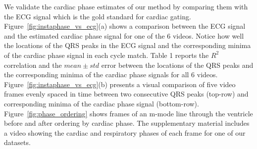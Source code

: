 \documentclass[runningheads,a4paper]{llncs}
\begin{document}
	We validate the cardiac phase estimates of our method by comparing them with the ECG signal which is the gold standard for cardiac gating. Figure~\ref{fig:instaphase_vs_ecg}(a) shows a comparison between the ECG signal and the estimated cardiac phase signal for one of the 6 videos. Notice how well the locations of the QRS peaks in the ECG signal and the corresponding minima of the cardiac phase signal in each cycle match. Table 1 reports the $R^2$ correlation and the $mean \pm std$ error between the locations of the QRS peaks and the corresponding minima of the cardiac phase signals for all 6 videos. Figure~\ref{fig:instaphase_vs_ecg}(b) presents a visual comparison of five video frames evenly spaced in time between two consecutive QRS peaks (top-row) and corresponding minima of the cardiac phase signal (bottom-row). Figure~\ref{fig:phase_ordering} shows frames of an m-mode line through the ventricle before and after ordering by cardiac phase. The supplementary material includes a video showing the cardiac and respiratory phases of each frame for one of our datasets.
	
\end{document}
